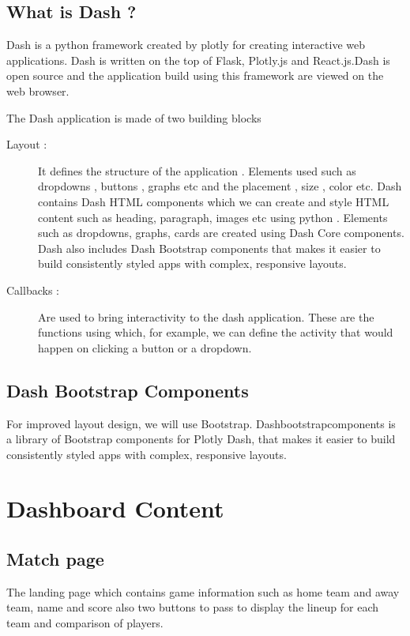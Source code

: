 \documentclass[letterpaper,10pt,english]{jupyterBook}
\begin{document}
\subsection{What is Dash ?}
\label{\detokenize{Chap3/Chap3:what-is-dash}}
\sphinxAtStartPar
Dash is a python framework created by plotly for creating interactive web applications. Dash is written on the top of Flask, Plotly.js and React.js.Dash is open source and the application build using this framework are viewed on the web browser.

\sphinxAtStartPar
The Dash application is made of two building blocks
\begin{description}
\item[{Layout :}] \leavevmode
\sphinxAtStartPar
It defines the structure of the application . Elements used such as dropdowns , buttons , graphs etc and the placement , size , color etc. Dash contains Dash HTML components which we can create and style HTML content such as heading, paragraph, images etc using python . Elements such as dropdowns, graphs, cards are created using Dash Core components.
Dash also includes Dash Bootstrap components that makes it easier to build consistently styled apps with complex, responsive layouts.

\item[{Callbacks :}] \leavevmode
\sphinxAtStartPar
Are used to bring interactivity to the dash application. These are the functions using which, for example, we can define the activity that would happen on clicking a button or a dropdown.

\end{description}


\subsection{Dash Bootstrap Components}
\label{\detokenize{Chap3/Chap3:dash-bootstrap-components}}
\sphinxAtStartPar
For improved layout design, we will use Bootstrap. Dash\sphinxhyphen{}bootstrap\sphinxhyphen{}components is a library of Bootstrap components for Plotly Dash, that makes it easier to build consistently styled apps with complex, responsive layouts.


\section{Dashboard Content}
\label{\detokenize{Chap3/Chap3:dashboard-content}}

\subsection{Match page}
\label{\detokenize{Chap3/Chap3:match-page}}
\sphinxAtStartPar
The landing page which contains game information such as home team and away team, name and score also two buttons to pass to display the line\sphinxhyphen{}up for each team and comparison of players.
\end{document}
